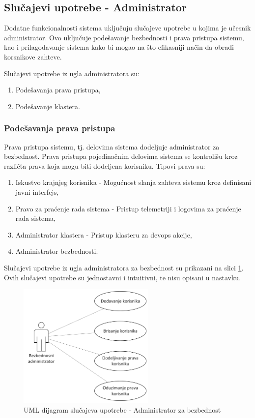 \documentclass[12pt,oneside]{memoir}
\begin{document}
\subsection{Slučajevi upotrebe - Administrator}

Dodatne funkcionalnosti sistema uključuju slučajeve upotrebe u kojima je učesnik administrator. Ovo uključuje podešavanje bezbednosti i prava pristupa sistemu, kao i prilagođavanje sistema kako bi mogao na što efikasniji način da obradi korsnikove zahteve.

Slučajevi upotrebe iz ugla administratora su:
\begin{enumerate}
\item Podešavanja prava pristupa,
\item Podešavanje klastera.
\end{enumerate}

\subsubsection{Podešavanja prava pristupa}
Prava pristupa sistemu, tj. delovima sistema dodeljuje administrator za bezbednost. Prava pristupa pojedinačnim delovima sistema se kontrolišu kroz različta prava koja mogu biti dodeljena korisniku. Tipovi prava su:
	\begin{enumerate}
	\item Iskustvo krajnjeg korisnika - Mogućnost slanja zahteva sistemu kroz definisani javni interfejs,
	\item Pravo za praćenje rada sistema - Pristup telemetriji i logovima za praćenje rada sistema,
	\item Administrator klastera - Pristup klasteru za devops akcije,
	\item Administrator bezbednosti.
	\end{enumerate}
Slučajevi upotrebe iz ugla administratora za bezbednost su prikazani na slici \ref{fig:slucajupotrebe_aadadmin}. Ovih slučajevi upotrebe su jednostavni i intuitivni, te nisu opisani u nastavku.

\begin{figure}[!ht]
  \centering
  \includegraphics[width=0.6\textwidth]{./images/dijagram_slucajeva_upotrebe_administrator_sistema_aadadmin.png}
  \caption{UML dijagram slučajeva upotrebe - Administrator za bezbednost}
  \label{fig:slucajupotrebe_aadadmin}
\end{figure}
\end{document}
